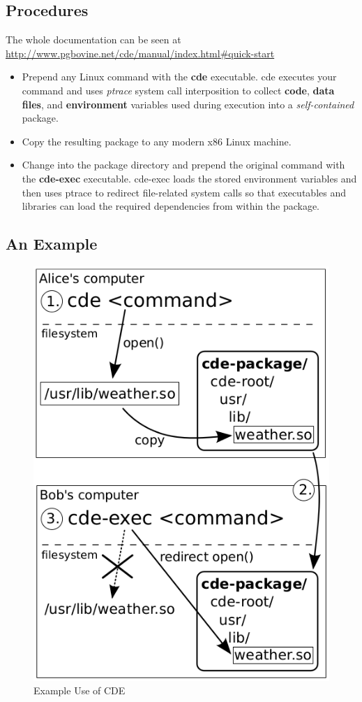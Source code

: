 \documentclass{report}
\begin{document}
\subsection{Procedures}
\label{sec:procedures}

The whole documentation can be seen at {\url{http://www.pgbovine.net/cde/manual/index.html#quick-start}}
\begin{itemize}
\item \textsf{Prepend} any Linux command with the \textbf{cde} executable. cde executes your command and uses \emph{ptrace} system call interposition to collect \textbf{code}, \textbf{data files}, and \textbf{environment} variables used during execution into a \emph{self-contained} package.
\item \textsf{Copy} the resulting package to any modern x86 Linux machine.
\item Change into the package directory and prepend the original command with the \textbf{cde-exec} executable. \textsf{cde-exec} loads the stored environment variables and then uses ptrace to redirect file-related system calls so that executables and libraries can load the required dependencies from within the package.
\end{itemize}

\subsection{An Example}
\label{sec:an-example}
\begin{figure}[t]
  \centering
  \includegraphics[width=.8\textwidth]{CDE_example.png}
  \caption{Example Use of CDE}
\end{figure}
\end{document}
